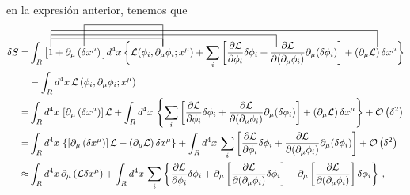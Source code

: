 \begin{frame}
en la expresión anterior, tenemos que
\begin{align}
  \delta S =&
\contraction[2ex]{\int_{R} \big[} {1}{+\partial_{\mu} \left( \delta x^{\mu}  \right)\big]  d^4x\,\bigg\{}{ \mathcal{L}(\phi_i,\partial_{\mu}\phi_i;x^\mu)}
\contraction[3ex]{\int_{R} \big[} {1}{+\partial_{\mu} \left( \delta x^{\mu}  \right)\big]  d^4x\,\bigg\{ \mathcal{L}(\phi_i,\partial_{\mu}\phi_i;x^\mu)+}{\sum_i \left[ \frac{\partial\mathcal{L}}{\partial\phi_i}\delta\phi_{i} +\frac{\partial\mathcal{L}}{\partial(\partial_{\mu}\phi_i)}\partial_{\mu}(\delta\phi_{i}) \right]}
\contraction[4ex]{\int_{R} \big[} {1}{+\partial_{\mu} \left( \delta x^{\mu}  \right)\big]  d^4x\,\bigg\{ \mathcal{L}(\phi_i,\partial_{\mu}\phi_i;x^\mu)+\sum_i \left[ \frac{\partial\mathcal{L}}{\partial\phi_i}\delta\phi_{i} +\frac{\partial\mathcal{L}}{\partial(\partial_{\mu}\phi_i)}\partial_{\mu}(\delta\phi_{i}) \right]+}{\left( \partial_{\mu}\mathcal{L} \right)\delta x^{\mu}}
\contraction[5ex]{\int_{R} \big[1+}{\partial_{\mu} \left( \delta x^{\mu}  \right)}{\big]  d^4x\,\bigg\{}{ \mathcal{L}(\phi_i,\partial_{\mu}\phi_i;x^\mu)}              
  \int_{R} \big[ 1+\partial_{\mu} \left( \delta x^{\mu}  \right)\big]  d^4x\,\bigg\{ \mathcal{L}(\phi_i,\partial_{\mu}\phi_i;x^\mu)+\sum_i \left[ \frac{\partial\mathcal{L}}{\partial\phi_i}\delta\phi_{i} +\frac{\partial\mathcal{L}}{\partial(\partial_{\mu}\phi_i)}\partial_{\mu}(\delta\phi_{i}) \right]+\left( \partial_{\mu}\mathcal{L} \right)\delta x^{\mu} \bigg\}\nonumber\\
      &- \int_{R}d^4x\,\mathcal{L} \left( \phi_{i},\partial_{\mu}\phi_i;x^\mu \right) \nonumber\\
  =&\int_{R} d^4x\,\left[ \partial_{\mu} \left( \delta x^{\mu}  \right)\right] \mathcal{L} + \int_{R}d^4x\,\left\{\sum_i \left[ \frac{\partial\mathcal{L}}{\partial\phi_i}\delta\phi_{i} +\frac{\partial\mathcal{L}}{\partial(\partial_{\mu}\phi_i)}\partial_{\mu}(\delta\phi_{i}) \right]+\left( \partial_{\mu}\mathcal{L} \right)\delta x^{\mu} \right\}+\mathcal{O} \left( \delta^2 \right)\nonumber\\
  \label{eq:intermediate}
   =&\int_{R} d^4x\,\left\{\left[ \partial_{\mu} \left( \delta x^{\mu}  \right)\right] \mathcal{L} +\left( \partial_{\mu}\mathcal{L} \right)\delta x^{\mu}\right\} + \int_{R}d^4x\,\sum_i \left[ \frac{\partial\mathcal{L}}{\partial\phi_i}\delta\phi_{i} +\frac{\partial\mathcal{L}}{\partial(\partial_{\mu}\phi_i)}\partial_{\mu}(\delta\phi_{i}) \right] +\mathcal{O} \left( \delta^2 \right)\\
  \approx&\int_{R} d^4x\,\partial_{\mu} \left(\mathcal{L} \delta x^{\mu}  \right)  + \int_{R}d^4x\,\sum_i \left\{ \frac{\partial\mathcal{L}}{\partial\phi_i}\delta\phi_{i} +\partial_{\mu} \left[ \frac{\partial\mathcal{L}}{\partial(\partial_{\mu}\phi_i)}\delta\phi_{i} \right]-\partial_{\mu} \left[ \frac{\partial\mathcal{L}}{\partial(\partial_{\mu}\phi_i)}\right]\delta\phi_{i}  \right\}\nonumber\,,

\end{align}
\end{frame}
